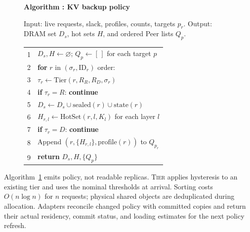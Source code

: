 \begin{figure}[t]
  \raggedright
  \label{alg:placement}
  \noindent\textbf{Algorithm \thedesignalgorithm: KV backup policy}
  \par\smallskip
  \noindent Input: live requests, slack, profiles, counts, targets $p_r$.
  Output: DRAM set $D_s$, hot sets $H$, and ordered Peer lists $Q_p$.
  \par\smallskip
  \begin{tabularx}{\columnwidth}{@{}r@{\quad}X@{}}
    \toprule
    1 & $D_s,H\gets\varnothing$; $Q_p\gets[\,]$ for each target $p$ \\
    2 & \textbf{for} $r$ in $(\sigma_r,\mathrm{ID}_r)$ order: \\
    3 & \quad$\tau_r\gets\mathrm{Tier}(r,R_R,R_D,\sigma_r)$ \\
    4 & \quad\textbf{if} $\tau_r=R$: \textbf{continue} \\
    5 & \quad$D_s\gets D_s\cup\mathrm{sealed}(r)\cup\mathrm{state}(r)$ \\
    6 & \quad$H_{r,l}\gets\mathrm{HotSet}(r,l,K_l)$ for each layer $l$ \\
    7 & \quad\textbf{if} $\tau_r=D$: \textbf{continue} \\
    8 & \quad Append $(r,\{H_{r,l}\},\mathrm{profile}(r))$ to $Q_{p_r}$ \\
    9 & \textbf{return} $D_s,H,\{Q_p\}$ \\
    \bottomrule
  \end{tabularx}
\end{figure}

Algorithm~\ref{alg:placement} emits policy, not readable replicas.
\textsc{Tier} applies hysteresis to an existing tier and uses the nominal
thresholds at arrival. Sorting costs $O(n\log n)$ for $n$ requests;
physical shared objects are deduplicated during allocation. Adapters
reconcile changed policy with committed copies and return their actual
residency, commit status, and loading estimates for the next policy refresh.
